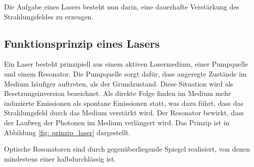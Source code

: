 Die Aufgabe eines Lasers besteht nun darin, eine dauerhafte Verstärkung des Strahlungsfeldes zu erzeugen.

\subsection{Funktionsprinzip eines Lasers}
Ein Laser besteht prinzipiell aus einem aktiven Lasermedium, einer Pumpquelle und einem Resonator. Die Pumpquelle sorgt dafür, dass
angeregte Zustände im Medium häufiger auftreten, als der Grundzustand. Diese Situation wird als Besetzungsinversion bezeichnet. Als direkte
Folge finden im Medium mehr induzierte Emissionen als spontane Emissionen statt, was dazu führt, dass das Strahlungsfeld durch das Medium verstärkt wird.
Der Resonator bewirkt, dass der Laufweg der Photonen im Medium verlängert wird. Das Prinzip ist in Abbildung \ref{fig: prinzip_laser} dargestellt.

Optische Resonatoren sind durch gegenüberliegende Spiegel realisiert, von denen mindestens einer halbdurchlässig ist.






